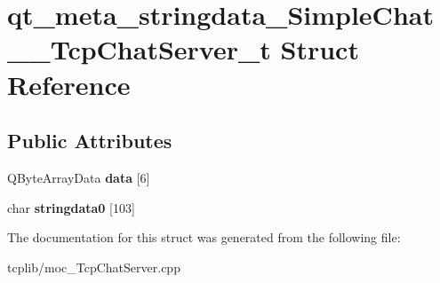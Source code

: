 \hypertarget{structqt__meta__stringdata__SimpleChat____TcpChatServer__t}{\section{qt\-\_\-meta\-\_\-stringdata\-\_\-\-Simple\-Chat\-\_\-\-\_\-\-Tcp\-Chat\-Server\-\_\-t Struct Reference}
\label{structqt__meta__stringdata__SimpleChat____TcpChatServer__t}
}
\subsection*{Public Attributes}
\begin{DoxyCompactItemize}
\item 
\hypertarget{structqt__meta__stringdata__SimpleChat____TcpChatServer__t_a53393f0c64f67d48567af46f5caa29a0}{Q\-Byte\-Array\-Data {\bfseries data} \mbox{[}6\mbox{]}}\label{structqt__meta__stringdata__SimpleChat____TcpChatServer__t_a53393f0c64f67d48567af46f5caa29a0}

\item 
\hypertarget{structqt__meta__stringdata__SimpleChat____TcpChatServer__t_a52a1ab6498daa7fc504f3d7c4685a007}{char {\bfseries stringdata0} \mbox{[}103\mbox{]}}\label{structqt__meta__stringdata__SimpleChat____TcpChatServer__t_a52a1ab6498daa7fc504f3d7c4685a007}

\end{DoxyCompactItemize}


The documentation for this struct was generated from the following file\-:\begin{DoxyCompactItemize}
\item 
tcplib/moc\-\_\-\-Tcp\-Chat\-Server.\-cpp\end{DoxyCompactItemize}
